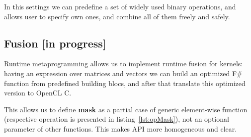 In this settings we can predefine a set of widely used binary operations, and allows user to specify own ones, and combine all of them freely and safely.


\subsection{Fusion [in progress]}

Runtime metaprogramming allows us to implement runtime fusion for kernels: having an expression over matrices and vectors we can build an optimized F\# function from predefined building blocs, and after that translate this optimized version to OpenCL C.

This allows us to define \textbf{mask} as a partial case of generic element-wise function (respective operation is presented in listing~\ref{lst:opMask}), not an optional parameter of other functions.
This makes API more homogeneous and clear. 
